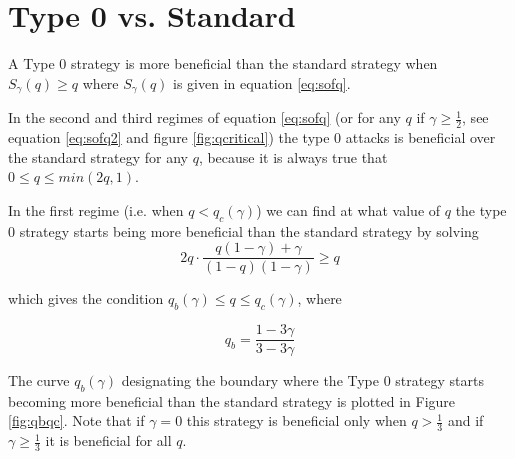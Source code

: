 \documentclass[letterpaper,12pt]{report}
\theoremstyle{plain}
\theoremstyle{definition}
\begin{document}
\section{Type 0 vs. Standard}\label{Type0overStandard}

A Type 0 strategy is more beneficial than the standard strategy when $S_\gamma(q)\geq q$ where $S_\gamma(q)$ is given in equation \ref{eq:sofq}. 

In the second and third regimes of equation \ref{eq:sofq} (or for any $q$ if $\gamma\geq\frac{1}{2}$, see equation \ref{eq:sofq2} and figure \ref{fig:qcritical}) the type 0 attacks is beneficial over the standard strategy for any $q$, because it is always true that $0\leq q \leq min(2q,1)$. 

In the first regime (i.e. when $q<q_c(\gamma)$) we can find at what value of $q$ the type 0 strategy starts being more beneficial than the standard strategy by solving
\begin{equation}\label{eq:type0benefitonhonestequation}
2q\cdot\frac{q(1-\gamma)+\gamma}{(1-q)(1-\gamma)}\geq q
\end{equation}

which gives the condition $q_b(\gamma)\leq q \leq q_c(\gamma)$, where 

\begin{equation}\label{eq:qb}
q_b= \dfrac{1-3\gamma}{3-3\gamma}
\end{equation}

The curve $q_b(\gamma)$ designating the boundary where the Type 0 strategy starts becoming more beneficial than the standard strategy is plotted in Figure \ref{fig:qbqc}.
Note that if $\gamma=0$ this strategy is beneficial only when $q>\frac{1}{3}$ and if $\gamma\geq\frac{1}{3}$ it is beneficial for all $q$.

\noindent%
\begin{minipage}{\linewidth}
\label{fig:qbqc}
\end{minipage}
\linebreak
\end{document}
